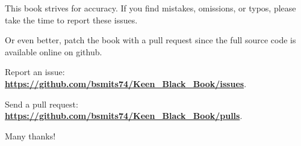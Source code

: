 This book strives for accuracy. If you find mistakes, omissions, or typos, please take the time to report these issues.\\ 
\par
Or even better, patch the book with a pull request since the full source code is available online on github.\\
\par
Report an issue: \textbf{\href{https://github.com/bsmits74/Keen_Black_Book/issues}{https://github.com/bsmits74/Keen\_Black\_Book/issues}}.\\
\par
Send a pull request: \textbf{\href{https://github.com/bsmits74/Keen_Black_Book/pulls}{https://github.com/bsmits74/Keen\_Black\_Book/pulls}}.\\
\par
Many thanks!\\
